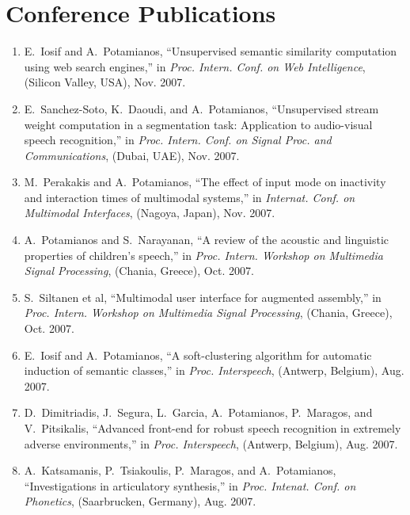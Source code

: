 \newpage


\section*{Conference Publications}

\begin{enumerate}

\item
E.~Iosif and A.~Potamianos, ``Unsupervised semantic similarity computation
  using web search engines,'' in {\em Proc. Intern. Conf. on Web Intelligence},
  (Silicon Valley, USA), Nov. 2007.

\item
E.~Sanchez-Soto, K.~Daoudi, and A.~Potamianos, ``Unsupervised stream weight
  computation in a segmentation task: Application to audio-visual speech
  recognition,'' in {\em Proc. Intern. Conf. on Signal Proc. and
  Communications}, (Dubai, UAE), Nov. 2007.

\item
M.~Perakakis and A.~Potamianos, ``The effect of input mode on inactivity and
  interaction times of multimodal systems,'' in {\em Internat. Conf. on
  Multimodal Interfaces}, (Nagoya, Japan), Nov. 2007.

\item
A.~Potamianos and S.~Narayanan, ``A review of the acoustic and linguistic
  properties of children's speech,'' in {\em Proc. Intern. Workshop on
  Multimedia Signal Processing}, (Chania, Greece), Oct. 2007.

\item
{S.~Siltanen et al}, ``Multimodal user interface for augmented assembly,'' in
  {\em Proc. Intern. Workshop on Multimedia Signal Processing}, (Chania,
  Greece), Oct. 2007.

\item
E.~Iosif and A.~Potamianos, ``A soft-clustering algorithm for automatic
  induction of semantic classes,'' in {\em Proc. Interspeech}, (Antwerp,
  Belgium), Aug. 2007.

\item
D.~Dimitriadis, J.~Segura, L.~Garcia, A.~Potamianos, P.~Maragos, and
  V.~Pitsikalis, ``Advanced front-end for robust speech recognition in
  extremely adverse environments,'' in {\em Proc. Interspeech}, (Antwerp,
  Belgium), Aug. 2007.

\item
A.~Katsamanis, P.~Tsiakoulis, P.~Maragos, and A.~Potamianos, ``Investigations
  in articulatory synthesis,'' in {\em Proc. Intenat. Conf. on Phonetics},
  (Saarbrucken, Germany), Aug. 2007.


\end{enumerate}
